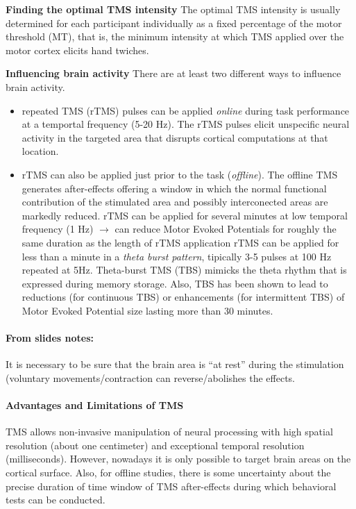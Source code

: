 \documentclass[12pt,article,oneside,a4paper]{memoir}
\begin{document}
\textbf{Finding the optimal TMS intensity} The optimal TMS intensity is usually determined for each participant individually as a fixed percentage of the motor threshold (MT), that is, the minimum intensity at which TMS applied over the motor cortex elicits hand twiches.

\textbf{Influencing brain activity} There are at least two different ways to influence brain activity. 
\begin{itemize}
\item repeated TMS (rTMS) pulses can be applied \textit{online} during task performance at a temportal frequency (5-20 Hz).
\subitem The rTMS pulses elicit unspecific neural activity in the targeted area that disrupts cortical computations at that location.
\item rTMS can also be applied just prior to the task (\textit{offline}). The offline TMS generates after-effects offering a window in which the normal functional contribution of the stimulated area and possibly interconected areas are markedly reduced.
\subitem rTMS can be applied for several minutes at low temporal frequency (1 Hz) $\rightarrow$ can reduce Motor Evoked Potentials for roughly the same duration as the length of rTMS application
\subitem rTMS can be applied for less than a minute in a \textit{theta burst pattern}, tipically 3-5 pulses at 100 Hz repeated at 5Hz. Theta-burst TMS (TBS) mimicks the theta rhythm that is expressed during memory storage. Also, TBS has been shown to lead to reductions (for continuous TBS) or enhancements (for intermittent TBS) of Motor Evoked Potential size lasting more than 30 minutes.
\end{itemize}

\paragraph{From slides notes:} It is necessary to be sure that the brain area is ``at rest'' during the stimulation (voluntary movements/contraction can reverse/abolishes the effects.

\paragraph{Advantages and Limitations of TMS} TMS allows non-invasive manipulation of neural processing with high spatial resolution (about one centimeter) and exceptional temporal resolution (milliseconds). However, nowadays it is only possible to target brain areas on the cortical surface. Also, for offline studies, there is some uncertainty about the precise duration of time window of TMS after-effects during which behavioral tests can be conducted.
\end{document}
